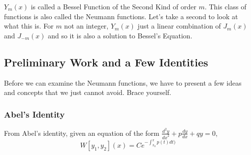 \documentclass[]{article}
\begin{document}
$Y_m(x)$ is called a Bessel Function of the Second Kind of order $m$. This class of functions is also called the Neumann functions. Let's take a second to look at what this is. For $m$ not an integer, $Y_m(x)$ just a linear combination of $J_m(x)$ and $J_{-m}(x)$ and so it is also a solution to Bessel's Equation.

\subsection{Preliminary Work and a Few Identities}
Before we can examine the Neumann functions, we have to present a few ideas and concepts that we just cannot avoid. Brace yourself.
\subsubsection*{Abel's Identity}
From Abel's identity, given an equation of the form $ \frac{d^2y}{{dx}^2} + p \frac{dy}{dx} + qy = 0$,
{\Large
\begin{equation}
	 W[y_1,y_2] (x) = Ce^{-\int_{x_0}^{x}p(t)dt)}
\end{equation}}
\end{document}
